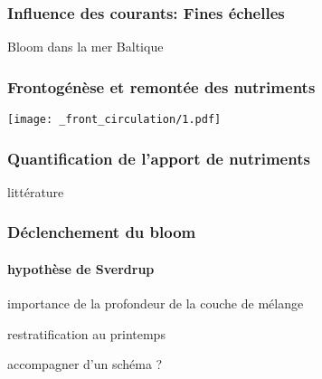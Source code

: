 
{
\begin{frame}
  \frametitle{Influence des courants: Fines échelles}
  \hspace{8cm}
  \begin{minipage}{3cm}
    Bloom dans la mer Baltique
  \end{minipage}
\end{frame}
}


\begin{frame}
  \frametitle{Frontogénèse et remontée des nutriments}
  \centering
  \texttt{[image: \_front\_circulation/1.pdf]}%
\end{frame}


\begin{frame}
  \frametitle{Quantification de l'apport de nutriments}

  littérature

\end{frame}


\begin{frame}
  \frametitle{Déclenchement du bloom}
  \framesubtitle{hypothèse de Sverdrup}
  importance de la profondeur de la couche de mélange
  \vspace{\baselineskip}

  restratification au printemps
  \vspace{\baselineskip}

  accompagner d'un schéma ?
\end{frame}


